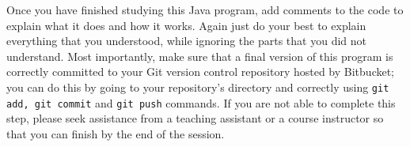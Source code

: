 Once you have finished studying this Java program, add comments to the code to explain what it does and how it works.
Again just do your best to explain everything that you understood, while ignoring the parts that you did not understand.
Most importantly, make sure that a final version of this program is correctly committed to your Git version control
repository hosted by Bitbucket; you can do this by going to your repository's directory and correctly using {\tt git
add, git commit} and {\tt git push} commands. If you are not able to complete this step, please seek assistance from a
teaching assistant or a course instructor so that you can finish by the end of the session.





    
